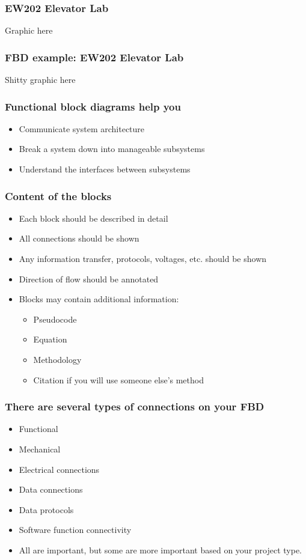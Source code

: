 \documentclass[aspectratio=169]{beamer}
\begin{document}
\begin{frame}
\begin{frame}
\frametitle{EW202 Elevator Lab}
Graphic here
\end{frame}

\begin{frame}
\frametitle{FBD example: EW202 Elevator Lab}
Shitty graphic here
\end{frame}





\begin{frame}
\frametitle{Functional block diagrams help you}
\begin{itemize}
\item Communicate system architecture
\item Break a system down into manageable subsystems
\item Understand the interfaces between subsystems
\end{itemize}
\end{frame}

\begin{frame}
\frametitle{Content of the blocks}
\begin{itemize}
\item Each block should be described in detail
\item All connections should be shown
\item Any information transfer, protocols, voltages, etc. should be shown
\item Direction of flow should be annotated
\item Blocks may contain additional information:
\begin{itemize}
\item Pseudocode
\item Equation
\item Methodology
\item Citation if you will use someone else's method
\end{itemize}
\end{itemize}
\end{frame}

\begin{frame}
\frametitle{There are several types of connections on your FBD}
\begin{itemize}
\item Functional
\item Mechanical
\item Electrical connections
\item Data connections
\item Data protocols
\item Software function connectivity
\item All are important, but some are more important based on your project type.
\end{itemize}
\end{frame}


\end{frame}
\end{document}
